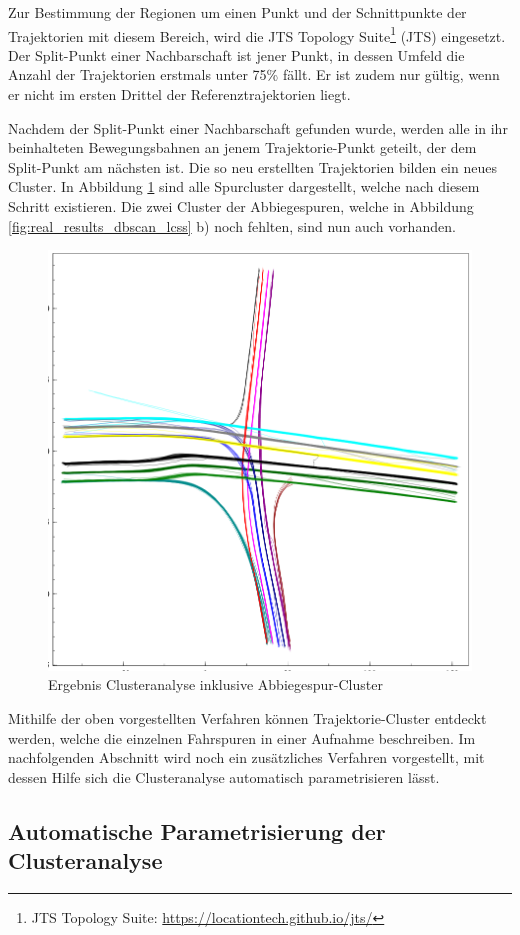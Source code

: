 Zur Bestimmung der Regionen um einen Punkt und der Schnittpunkte der Trajektorien mit diesem Bereich,
wird die JTS Topology Suite\footnote{JTS Topology Suite: \url{https://locationtech.github.io/jts/}}
(JTS) eingesetzt. Der Split-Punkt einer Nachbarschaft ist jener Punkt, in dessen Umfeld die Anzahl der
Trajektorien erstmals unter 75\% fällt. Er ist zudem nur gültig, wenn er nicht im ersten Drittel der
Referenztrajektorien liegt.

Nachdem der Split-Punkt einer Nachbarschaft gefunden wurde, werden alle in ihr beinhalteten Bewegungsbahnen
an jenem Trajektorie-Punkt geteilt, der dem Split-Punkt am nächsten ist.
Die so neu erstellten Trajektorien bilden ein neues Cluster. In Abbildung \ref{fig:real_turning_lane_result}
sind alle Spurcluster dargestellt, welche nach diesem Schritt existieren. Die zwei Cluster der Abbiegespuren,
welche in Abbildung \ref{fig:real_results_dbscan_lcss} b) noch fehlten, sind nun auch vorhanden.

\begin{figure}[H]
    \centering
    \includegraphics[width=0.35\linewidth]{resources/img/umsetzung/U1/clusters_with_turning_lanes}
    \caption{Ergebnis Clusteranalyse inklusive Abbiegespur-Cluster}
    \label{fig:real_turning_lane_result}
\end{figure}

Mithilfe der oben vorgestellten Verfahren können Trajektorie-Cluster entdeckt werden, welche
die einzelnen Fahrspuren in einer Aufnahme beschreiben. Im nachfolgenden Abschnitt wird noch ein
zusätzliches Verfahren vorgestellt, mit dessen Hilfe sich die Clusteranalyse automatisch parametrisieren lässt. 

\subsection{Automatische Parametrisierung der Clusteranalyse}
\label{sec:real1_adjustment_clustering_parameter}

